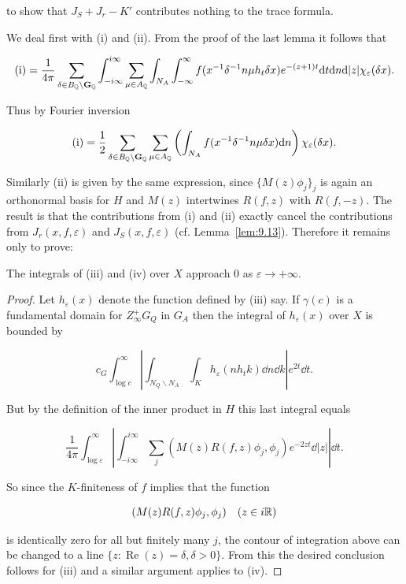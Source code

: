 to show that $J_S + J_r - K'$ contributes nothing to the trace formula.

We deal first with (i) and (ii). From the proof of the last lemma it follows that

\[
\text{(i)} = \frac{1}{4\pi}\sum_{\delta \in B_{\mathbb{Q}} \backslash \mathbf{G}_{\mathbb{Q}}}\int_{-i\infty}^{i\infty}\sum_{\mu \in A_{\mathbb{Q}}}\int_{N_A}\int_{-\infty}^{\infty} f(x^{-1}\delta^{-1}n\mu h_t\delta x)e^{-(z+1)t}\mathrm{d} t\mathrm{d} n\mathrm{d}|z|\chi_\varepsilon(\delta x).
\]

Thus by Fourier inversion

\[
\text{(i)} = \frac{1}{2}\sum_{\delta \in B_{\mathbb{Q}} \backslash \mathbf{G}_{\mathbb{Q}}}\sum_{\mu \in A_{\mathbb{Q}}}\left(\int_{N_A} f(x^{-1}\delta^{-1}n\mu\delta x)\mathrm{d} n\right)\chi_\varepsilon(\delta x).
\]

Similarly (ii) is given by the same expression, since $\{M(z)\phi_j\}_j$ is again an orthonormal basis for $H$ and $M(z)$ intertwines $R(f,z)$ with $R(f,-z)$. The result is that the contributions from (i) and (ii) exactly cancel the contributions from $J_r(x,f,\varepsilon)$ and $J_S(x,f,\varepsilon)$ (cf. Lemma~\ref{lem:9.13}). Therefore it remains only to prove:

\begin{lemma}\label{lem:9.15}

The integrals of (iii) and (iv) over $X$ approach 0 as $\varepsilon \to +\infty$.

\end{lemma}

\begin{proof}

Let $h_\varepsilon(x)$ denote the function defined by (iii) say. If $\gamma(c)$ is a fundamental domain for $Z_\infty^{+}G_Q$ in $G_A$ then the integral of $h_\varepsilon(x)$ over $X$ is bounded by

\[
c_G\int_{\log c}^{\infty}\left|\int_{N_Q \backslash N_A}\int_K h_\varepsilon(nh_tk)\dd n\dd k\right|e^{2t}\dd t.
\]

But by the definition of the inner product in $H$ this last integral equals

\[
\frac{1}{4\pi}\int_{\log \varepsilon}^{\infty}\left|\int_{-i\infty}^{i\infty}\sum_j (M(z)R(f, z)\phi_j, \phi_j)e^{-2zt}\dd|z|\right|\dd t.
\]

So since the $K$-finiteness of $f$ implies that the function

\[
(M(z)R(f, z)\phi_j, \phi_j) \quad (z \in i\mathbb{R})
\]

is identically zero for all but finitely many $j$, the contour of integration above can be changed to a line $\{z : \operatorname{Re}(z) = \delta, \delta > 0\}$. From this the desired conclusion follows for (iii) and a similar argument applies to (iv).

\end{proof}

